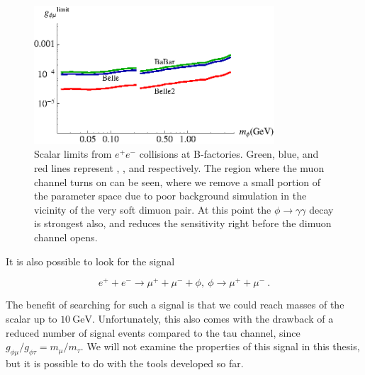 \begin{figure}[h]
    \centering
    \includegraphics[width=0.8\textwidth]{Figures/limits/ee_all}
    \caption[Scalar sensitivity limits from $e^+ e^-$ collisions at B-factories.]{Scalar limits from $e^+ e^-$ collisions at B-factories. Green, blue, and red lines represent \babar, \belle, and \belletwo respectively. The region where the muon channel turns on can be seen, where we remove a small portion of the parameter space due to poor background simulation in the vicinity of the very soft dimuon pair. At this point the $\phi \rightarrow \gamma \gamma$ decay is strongest also, and reduces the sensitivity right before the dimuon channel opens.}
    \label{fig:ee_limits}
\end{figure}

It is also possible to look for the signal

\begin{equation}
    e^+ + e^- \rightarrow \mu^+ + \mu^- + \phi,~\phi \rightarrow \mu^+ + \mu^-~\textrm{.}
\end{equation}

\noindent The benefit of searching for such a signal is that we could reach masses of the scalar up to $10~\textrm{GeV}$.
Unfortunately, this also comes with the drawback of a reduced number of signal events compared to the tau channel, since $g_{\phi\mu} / g_{\phi\tau} = m_\mu / m_\tau$.
We will not examine the properties of this signal in this thesis, but it is possible to do with the tools developed so far.
